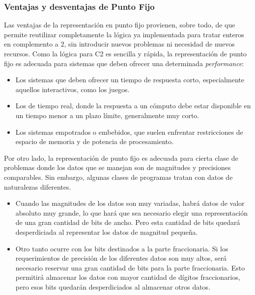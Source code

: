 \documentclass[spanish,a4paper,]{article}
\providecommand{\tightlist}{%
  \setlength{\itemsep}{0pt}\setlength{\parskip}{0pt}}
\begin{document}
\hypertarget{ventajas-y-desventajas-de-punto-fijo}{%
\subsubsection{Ventajas y desventajas de Punto
Fijo}\label{ventajas-y-desventajas-de-punto-fijo}}

Las ventajas de la representación en punto fijo provienen, sobre todo,
de que permite reutilizar completamente la lógica ya implementada para
tratar enteros en complemento a 2, sin introducir nuevos problemas ni
necesidad de nuevos recursos. Como la lógica para C2 es sencilla y
rápida, la representación de punto fijo es adecuada para sistemas que
deben ofrecer una determinada \emph{performance}:

\begin{itemize}
\tightlist
\item
  Los sistemas que deben ofrecer un tiempo de respuesta corto,
  especialmente aquellos interactivos, como los juegos.
\item
  Los de tiempo real, donde la respuesta a un cómputo debe estar
  disponible en un tiempo menor a un plazo límite, generalmente muy
  corto.
\item
  Los sistemas empotrados o embebidos, que suelen enfrentar
  restricciones de espacio de memoria y de potencia de procesamiento.
\end{itemize}

Por otro lado, la representación de punto fijo es adecuada para cierta
clase de problemas donde los datos que se manejan son de magnitudes y
precisiones comparables. Sin embargo, algunas clases de programas tratan
con datos de naturalezas diferentes.

\begin{itemize}
\tightlist
\item
  Cuando las magnitudes de los datos son muy variadas, habrá datos de
  valor absoluto muy grande, lo que hará que sea necesario elegir una
  representación de una gran cantidad de bits de ancho. Pero esta
  cantidad de bits quedará desperdiciada al representar los datos de
  magnitud pequeña.\\
\item
  Otro tanto ocurre con los bits destinados a la parte fraccionaria. Si
  los requerimientos de precisión de los diferentes datos son muy altos,
  será necesario reservar una gran cantidad de bits para la parte
  fraccionaria. Esto permitirá almacenar los datos con mayor cantidad de
  dígitos fraccionarios, pero esos bits quedarán desperdiciados al
  almacenar otros datos.
\end{itemize}
\end{document}
